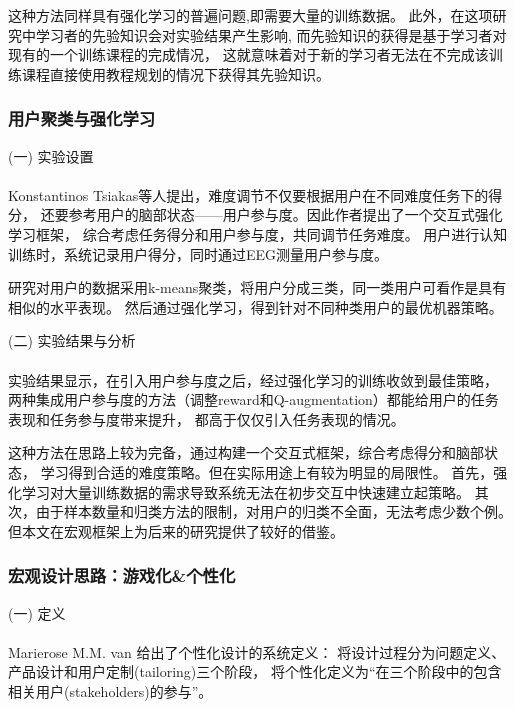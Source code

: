 \documentclass{article}
\begin{document}
            这种方法同样具有强化学习的普遍问题,即需要大量的训练数据。
            此外，在这项研究中学习者的先验知识会对实验结果产生影响,
            而先验知识的获得是基于学习者对现有的一个训练课程的完成情况，
            这就意味着对于新的学习者无法在不完成该训练课程直接使用教程规划的情况下获得其先验知识。

            \subsubsection{用户聚类与强化学习}
            (一) 实验设置\paragraph{}
            Konstantinos Tsiakas等人提出，难度调节不仅要根据用户在不同难度任务下的得分，
            还要参考用户的脑部状态——用户参与度。因此作者提出了一个交互式强化学习框架，
            综合考虑任务得分和用户参与度，共同调节任务难度。
            用户进行认知训练时，系统记录用户得分，同时通过EEG测量用户参与度。

            研究对用户的数据采用k-means聚类，将用户分成三类，同一类用户可看作是具有相似的水平表现。
            然后通过强化学习，得到针对不同种类用户的最优机器策略。

            (二) 实验结果与分析\paragraph{}
            实验结果显示，在引入用户参与度之后，经过强化学习的训练收敛到最佳策略，
            两种集成用户参与度的方法（调整reward和Q-augmentation）都能给用户的任务表现和任务参与度带来提升，
            都高于仅仅引入任务表现的情况。

            这种方法在思路上较为完备，通过构建一个交互式框架，综合考虑得分和脑部状态，
            学习得到合适的难度策略。但在实际用途上有较为明显的局限性。
            首先，强化学习对大量训练数据的需求导致系统无法在初步交互中快速建立起策略。
            其次，由于样本数量和归类方法的限制，对用户的归类不全面，无法考虑少数个例。
            但本文在宏观框架上为后来的研究提供了较好的借鉴。

            \subsubsection{宏观设计思路：游戏化\&个性化}
            (一) 定义\paragraph{}
            Marierose M.M. van 给出了个性化设计的系统定义：
            将设计过程分为问题定义、产品设计和用户定制(tailoring)三个阶段，
            将个性化定义为“在三个阶段中的包含相关用户(stakeholders)的参与”。
\end{document}
